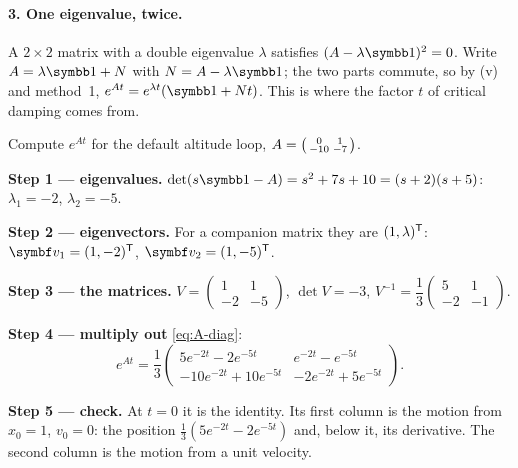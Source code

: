 \paragraph{3. One eigenvalue, twice.} A $2 \times 2$ matrix with a double eigenvalue $\lambda$ satisfies $(A - \lambda\Id)^2 = 0$. Write $A = \lambda\Id + N$ with $N = A - \lambda\Id$; the two parts commute, so by (v) and method~1, $e^{At} = e^{\lambda t}(\Id + Nt)$. This is where the factor $t$ of critical damping comes from.

\begin{example}
\label{ex:A-expm}
Compute $e^{At}$ for the default altitude loop, $A = \begin{psmallmatrix}0 & 1\\ -10 & -7\end{psmallmatrix}$.

\textbf{Step 1 — eigenvalues.} $\det(s\Id - A) = s^2 + 7s + 10 = (s + 2)(s + 5)$: $\lambda_1 = -2$, $\lambda_2 = -5$.

\textbf{Step 2 — eigenvectors.} For a companion matrix they are $(1, \lambda)^{\mathsf{T}}$: $\symbf v_1 = (1, -2)^\T$, $\symbf v_2 = (1, -5)^\T$.

\textbf{Step 3 — the matrices.} $V = \begin{pmatrix}1 & 1\\ -2 & -5\end{pmatrix}$, $\det V = -3$, $V^{-1} = \dfrac13\begin{pmatrix}5 & 1\\ -2 & -1\end{pmatrix}$.

\textbf{Step 4 — multiply out} \cref{eq:A-diag}:
\begin{equation*}
  e^{At} = \frac13\begin{pmatrix}
    5e^{-2t} - 2e^{-5t} & e^{-2t} - e^{-5t}\\[2pt]
    -10e^{-2t} + 10e^{-5t} & -2e^{-2t} + 5e^{-5t}
  \end{pmatrix} .
\end{equation*}

\textbf{Step 5 — check.} At $t = 0$ it is the identity. Its first column is the motion from $x_0 = 1$, $v_0 = 0$: the position $\tfrac13(5e^{-2t} - 2e^{-5t})$ and, below it, its derivative. The second column is the motion from a unit velocity.
\end{example}


